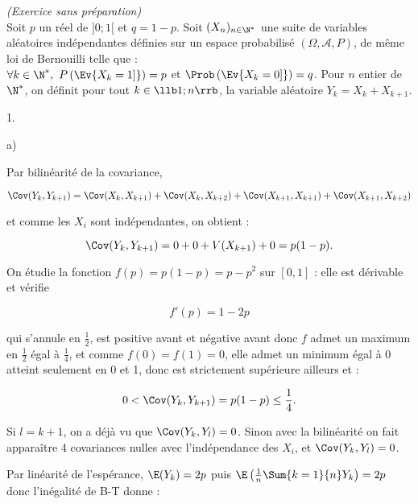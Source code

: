 \documentclass[11pt]{article}%
\begin{document}
\begin{exercice}{\it (Exercice sans préparation)}~\\
 Soit $p$ un réel de $]0;1[$ et $q = 1-p$. Soit $(X_{n})_{ n \in \N^*
}$
 une suite de variables aléatoires indépendantes définies sur un
 espace probabilisé $(\Omega, \mathcal{A}, P)$, de même loi de
 Bernouilli telle que : \\
 $ \forall k \in \N^*, \ P \left(\Ev{X_{k} = 1 ] }\right) = p$ et
$\Prob\left(\Ev{X_{k} = 0
 ] }\right) = q$. Pour $n$ entier de $\N^*$, on définit pour tout $k
\in
 \llb 1 ; n \rrb$, la variable aléatoire $Y_{k} = X_{k} + X_{k + 1}$.
 \begin{noliste}{1.}
 \setlength{\itemsep}{4mm}
 \item 
 \begin{noliste}{a)}
 \setlength{\itemsep}{2mm}
 
 \item Par bilinéarité de la covariance,
 
\[
 \Cov ( Y_{k}, Y_{k + 1} ) = \Cov ( X_{k}, X_{k + 1} ) + \Cov ( X_{k},
X_{k + 2} ) + \Cov ( X_{k + 1}, X_{k + 1} ) + \Cov ( X_{k + 1}, X_{k +
2} ) 
\]

 et comme les $X_{i}$ sont indépendantes, on obtient : 
 
\[
 \Cov ( Y_{k}, Y_{k + 1} ) = 0 + 0 + V (X_{k + 1} ) + 0 = p (1-p). 
\]

 \item On étudie la fonction $ f(p ) = p (1-p) = p - p^{2}$ sur $[0,1]$
: elle est dérivable et vérifie
 
\[
 f'(p) = 1 - 2 p 
\]

 qui s'annule en $\frac{1}{2}$, est positive avant et négative avant
donc $f$ admet un maximum en $\frac{1}{2}$ égal à $\frac{1}{4}$, et
comme $f(0) = f(1) = 0$, elle admet un minimum égal à 0 atteint
seulement en 0 et 1, donc est strictement supérieure ailleurs et : 
 
\[
 0 < \Cov ( Y_{k}, Y_{k + 1} ) = p (1-p ) \leq \frac{ 1 }{ 4 }. 
\]

 \end{noliste}

 \item Si $l = k + 1$, on a déjà vu que $\Cov ( Y_{k}, Y_{l} ) = 0$.
Sinon avec la bilinéarité on fait apparaître 4 covariances nulles avec
l'indépendance des $X_{i}$, et $\Cov ( Y_{k}, Y_{l} ) = 0$. \\

 \item Par linéarité de l'espérance, $\E( Y_{k} ) = 2p$ puis $\E\left(
\frac{1}{n} \Sum{k = 1}{n} Y_{k} \right) = 2 p $ donc l'inégalité de
B-T donne : 
 

\end{noliste}
\end{exercice}
\end{document}
